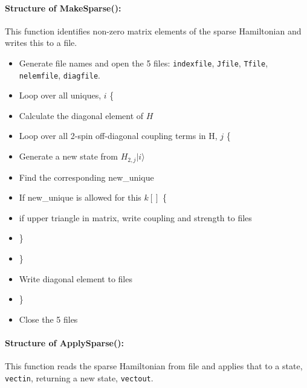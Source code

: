 \documentclass{article}
\begin{document}
\paragraph{Structure of MakeSparse():}
This function identifies non-zero matrix elements of the sparse Hamiltonian and writes this to a file.
\begin{itemize}
\item Generate file names and open the 5 files: \verb+indexfile+, \verb+Jfile+, \verb+Tfile+, \verb+nelemfile+, \verb+diagfile+.
\item Loop over all uniques, $i$ \{
\item \hspace{5mm} Calculate the diagonal element of $H$
\item \hspace{5mm} Loop over all 2-spin off-diagonal coupling terms in H, $j$ \{
\item \hspace{10mm} Generate a new state from $H_{2,j} |i\rangle $
\item \hspace{10mm} Find the corresponding new\_unique
\item \hspace{10mm} If new\_unique is allowed for this $k[]$ \{
\item \hspace{15mm} if upper triangle in matrix, write coupling and strength to files
\item \hspace{10mm} \}
\item \hspace{5mm} \}
\item \hspace{5mm} Write diagonal element to files
\item \}
\item Close the 5 files
\end{itemize}

\paragraph{Structure of ApplySparse():}
This function reads the sparse Hamiltonian from file and applies that to a state, \verb+vectin+, returning a new state, \verb+vectout+.
\end{document}
